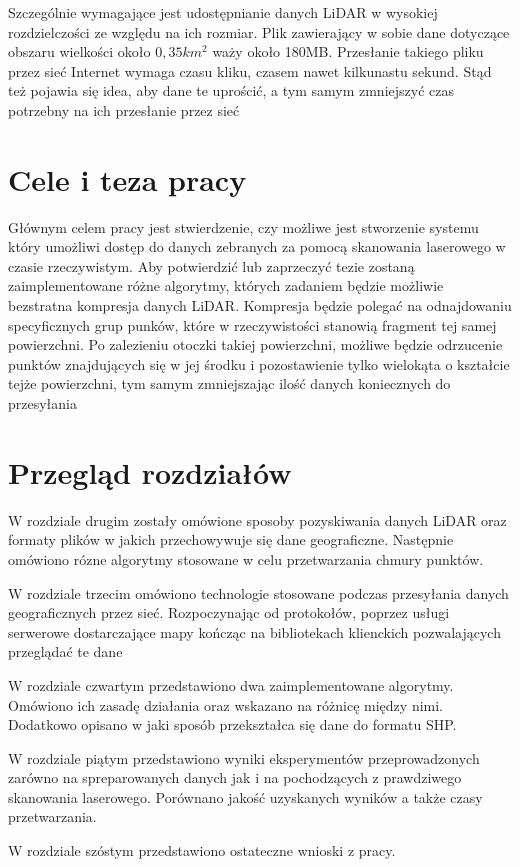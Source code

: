 Szczególnie wymagające jest udostępnianie danych LiDAR w wysokiej rozdzielczości ze względu na ich rozmiar. Plik zawierający
w sobie dane dotyczące obszaru wielkości około $0,35km^2$ waży około 180MB. Przesłanie takiego pliku przez sieć Internet wymaga
czasu kliku, czasem nawet kilkunastu sekund. Stąd też pojawia się idea, aby dane te uprościć, a tym samym zmniejszyć czas potrzebny
na ich przesłanie przez sieć

\section{Cele i teza pracy}

Głównym celem pracy jest stwierdzenie, czy możliwe jest stworzenie systemu który umożliwi dostęp do danych zebranych za pomocą
skanowania laserowego w czasie rzeczywistym. Aby potwierdzić lub zaprzeczyć tezie zostaną zaimplementowane różne algorytmy, których
zadaniem będzie możliwie bezstratna kompresja danych LiDAR. Kompresja będzie polegać na odnajdowaniu specyficznych grup punków, które
w rzeczywistości stanowią fragment tej samej powierzchni. Po zalezieniu otoczki takiej powierzchni, możliwe będzie odrzucenie punktów
znajdujących się w jej środku i pozostawienie tylko wielokąta o kształcie tejże powierzchni, tym samym zmniejszając ilość danych
koniecznych do przesyłania

\section{Przegląd rozdziałów}

W rozdziale drugim zostały omówione sposoby pozyskiwania danych LiDAR oraz formaty plików w jakich przechowywuje się dane geograficzne.
Następnie omówiono rózne algorytmy stosowane w celu przetwarzania chmury punktów.

W rozdziale trzecim omówiono technologie stosowane podczas przesyłania danych geograficznych przez sieć. Rozpoczynając od protokołów,
poprzez usługi serwerowe dostarczające mapy kończąc na bibliotekach klienckich pozwalających przeglądać te dane

W rozdziale czwartym przedstawiono dwa zaimplementowane algorytmy. Omówiono ich zasadę działania oraz wskazano na różnicę między nimi.
Dodatkowo opisano w jaki sposób przekształca się dane do formatu SHP.

W rozdziale piątym przedstawiono wyniki eksperymentów przeprowadzonych zarówno na spreparowanych danych jak i na pochodzących z prawdziwego
skanowania laserowego. Porównano jakość uzyskanych wyników a także czasy przetwarzania.

W rozdziale szóstym przedstawiono ostateczne wnioski z pracy.
